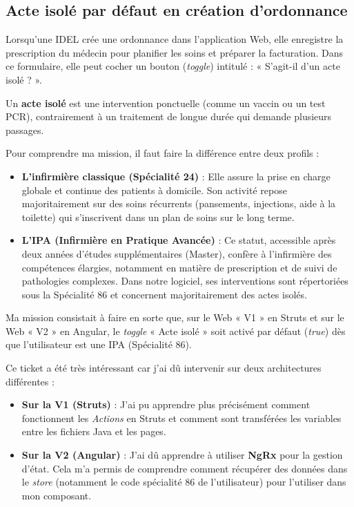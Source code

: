\documentclass{article}
\begin{document}
\subsection{Acte isolé par défaut en création d'ordonnance}
\label{subsec:acte-isole-defaut}

Lorsqu'une IDEL crée une ordonnance dans l'application Web, elle enregistre la prescription du médecin pour planifier les soins et préparer la facturation. Dans ce formulaire, elle peut cocher un bouton (\textit{toggle}) intitulé : « S'agit-il d'un acte isolé ? ».

Un \textbf{acte isolé} est une intervention ponctuelle (comme un vaccin ou un test PCR), contrairement à un traitement de longue durée qui demande plusieurs passages.

Pour comprendre ma mission, il faut faire la différence entre deux profils :

\begin{itemize}
    \item \textbf{L'infirmière classique (Spécialité 24)} : Elle assure la prise en charge globale et continue des patients à domicile. Son activité repose majoritairement sur des soins récurrents (pansements, injections, aide à la toilette) qui s'inscrivent dans un plan de soins sur le long terme.

    \newpage
    
    \item \textbf{L'IPA (Infirmière en Pratique Avancée)} : Ce statut, accessible après deux années d'études supplémentaires (Master), confère à l'infirmière des compétences élargies, notamment en matière de prescription et de suivi de pathologies complexes. Dans notre logiciel, ses interventions sont répertoriées sous la Spécialité 86 et concernent majoritairement des actes isolés.
\end{itemize}

Ma mission consistait à faire en sorte que, sur le Web « V1 » en Struts et sur le Web « V2 » en Angular, le \textit{toggle} « Acte isolé » soit activé par défaut (\textit{true}) dès que l'utilisateur est une IPA (Spécialité 86).

Ce ticket a été très intéressant car j'ai dû intervenir sur deux architectures différentes :

\begin{itemize}
    \item \textbf{Sur la V1 (Struts)} : J'ai pu apprendre plus précisément comment fonctionnent les \textit{Actions} en Struts et comment sont transférées les variables entre les fichiers Java et les pages.
    
    \item \textbf{Sur la V2 (Angular)} : J'ai dû apprendre à utiliser \textbf{NgRx} pour la gestion d'état. Cela m'a permis de comprendre comment récupérer des données dans le \textit{store} (notamment le code spécialité 86 de l'utilisateur) pour l'utiliser dans mon composant.
\end{itemize}
\end{document}
